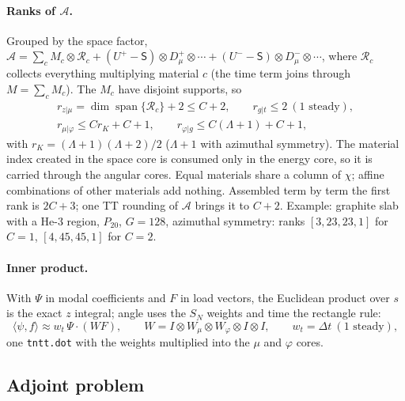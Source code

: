 \documentclass[11pt,a4paper]{article}
\newcommand{\kron}{\otimes}
\newcommand{\Lmax}{\Lambda}
\newcommand{\code}[1]{\texttt{#1}}
\begin{document}
\paragraph{Ranks of $\mathcal A$.} Grouped by the space factor, $\mathcal A=\sum_cM_c\kron\mathcal R_c+(U^+-\mathsf S)\kron D^+_\mu\kron\cdots+(U^--\mathsf S)\kron D^-_\mu\kron\cdots$, where $\mathcal R_c$ collects everything multiplying material $c$ (the time term joins through $M=\sum_cM_c$). The $M_c$ have disjoint supports, so
\begin{gather}
r_{z|\mu}=\dim\operatorname{span}\{\mathcal R_c\}+2\le C+2,\qquad r_{g|t}\le2\ (1\text{ steady}),\\
r_{\mu|\varphi}\le Cr_K+C+1,\qquad r_{\varphi|g}\le C(\Lmax+1)+C+1,
\end{gather}
with $r_K=(\Lmax+1)(\Lmax+2)/2$ ($\Lmax+1$ with azimuthal symmetry). The material index created in the space core is consumed only in the energy core, so it is carried through the angular cores. Equal materials share a column of $\chi$; affine combinations of other materials add nothing. Assembled term by term the first rank is $2C+3$; one TT rounding of $\mathcal A$ brings it to $C+2$. Example: graphite slab with a He-3 region, $P_{20}$, $G=128$, azimuthal symmetry: ranks $[3,23,23,1]$ for $C=1$, $[4,45,45,1]$ for $C=2$.

\paragraph{Inner product.} With $\Psi$ in modal coefficients and $F$ in load vectors, the Euclidean product over $s$ is the exact $z$ integral; angle uses the $S_N$ weights and time the rectangle rule:
\begin{equation}
\langle\psi,f\rangle\approx w_t\,\Psi\cdot(WF),\qquad W=I\kron W_\mu\kron W_\varphi\kron I\kron I,\qquad w_t=\Delta t\ (1\text{ steady}),
\label{eq:inner}
\end{equation}
one \code{tntt.dot} with the weights multiplied into the $\mu$ and $\varphi$ cores.

\subsection{Adjoint problem}
\label{sec:adjoint}
\end{document}

